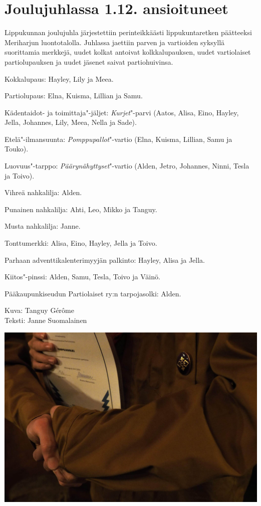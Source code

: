 \section{Joulujuhlassa 1.12. ansioituneet}

\begin{multicols}{2}
\noindent Lippukunnan joulujuhla järjestettiin perinteikkäästi 
lippukuntaretken päätteeksi Meriharjun luontotalolla. Juhlassa jaettiin 
parven ja vartioiden syksyllä suorittamia merkkejä, uudet kolkat antoivat 
kolkkalupauksen, uudet vartiolaiset partiolupauksen ja uudet jäsenet saivat 
partiohuivinsa.

Kokkalupaus: Hayley, Lily ja Meea.

Partiolupaus: Elna, Kuisma, Lillian ja Samu.

Kädentaidot- ja toimittaja"-jäljet: \textit{Kurjet}"-parvi (Aatos, Alisa, 
Eino, Hayley, Jella, Johannes, Lily, Meea, Nella ja Sade).

Etelä"-ilmansuunta: \textit{Pomppupallot}"-vartio (Elna, Kuisma, 
Lillian, Samu ja Touko).
\columnbreak

Luovuus"-tarppo: \textit{Päärynähyttyset}"-vartio (Alden, Jetro, Johannes, 
Ninni, Tesla ja Toivo).

Vihreä nahkalilja: Alden.

Punainen nahkalilja: Ahti, Leo, Mikko ja Tanguy.

Musta nahkalilja: Janne.

Tonttumerkki: Alisa, Eino, Hayley, Jella ja Toivo.

Parhaan adventtikalenterimyyjän palkinto: Hayley, Alisa ja Jella. 

Kiitos"-pinssi: Alden, Samu, Tesla, Toivo ja Väinö.

Pääkaupunkiseudun Partiolaiset ry:n tarpojasolki: Alden.

\vspace*{.50cm}
{\raggedleft Kuva: Tanguy Gérôme\\
Teksti: Janne Suomalainen\par}

\vfill

\end{multicols}

\vspace*{.16cm}
\noindent\includegraphics[width=\linewidth,trim={0 0.9cm 0 0.7cm},clip]{assets/pikkujoulu1}


